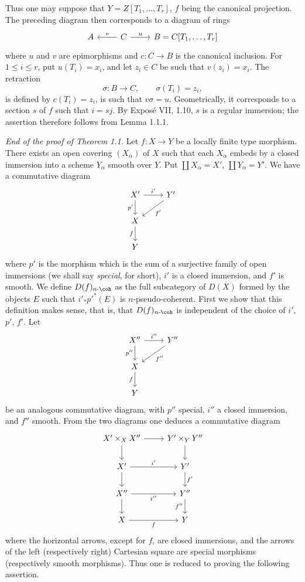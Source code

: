 \documentclass[11pt]{article}
\begin{document}
Thus one may suppose that \(Y=Z[T_1,\ldots,T_r]\), \(f\) being the canonical projection. The preceding diagram then corresponds to a diagram of rings
\[
\begin{tikzcd}
A & C \arrow[l,"v"'] \arrow[r,"u"] & B=C[T_1,\ldots,T_r]
\end{tikzcd}
\]
where \(u\) and \(v\) are epimorphisms and \(c:C\to B\) is the canonical inclusion. For \(1\leq i\leq r\), put \(u(T_i)=x_i\), and let \(z_i\in C\) be such that \(v(z_i)=x_i\). The retraction
\[
  \sigma:B\longrightarrow C,\qquad \sigma(T_i)=z_i,
\]
is defined by \(c(T_i)=z_i\), is such that \(v\sigma=u\). Geometrically, it corresponds to a section \(s\) of \(f\) such that \(i=sj\). By Exposé VII, 1.10, \(s\) is a regular immersion; the assertion therefore follows from Lemma 1.1.1.

\emph{End of the proof of Theorem 1.1.} Let \(f:X\to Y\) be a locally finite type morphism. There exists an open covering \((X_\alpha)\) of \(X\) such that each \(X_\alpha\) embeds by a closed immersion into a scheme \(Y_\alpha\) smooth over \(Y\). Put \(\coprod X_\alpha=X'\), \(\coprod Y_\alpha=Y'\). We have a commutative diagram
\[
\begin{tikzcd}
X' \arrow[r,"i'"] \arrow[d,"p'"'] & Y' \arrow[dl,"f'"]\\
X \arrow[d,"f"']\\
Y
\end{tikzcd}
\]
where \(p'\) is the morphism which is the sum of a surjective family of open immersions (we shall say \emph{special}, for short), \(i'\) is a closed immersion, and \(f'\) is smooth. We define \(D(f)_{n\text{-}\coh}\) as the full subcategory of \(D(X)\) formed by the objects \(E\) such that \(i'_*p'^*(E)\) is \(n\)-pseudo-coherent. First we show that this definition makes sense, that is, that \(D(f)_{n\text{-}\coh}\) is independent of the choice of \(i'\), \(p'\), \(f'\). Let
\[
\begin{tikzcd}
X'' \arrow[r,"i''"] \arrow[d,"p''"'] & Y'' \arrow[dl,"f''"]\\
X \arrow[d,"f"']\\
Y
\end{tikzcd}
\]
be an analogous commutative diagram, with \(p''\) special, \(i''\) a closed immersion, and \(f''\) smooth. From the two diagrams one deduces a commutative diagram
\[
\begin{tikzcd}
X'\times_X X'' \arrow[r] \arrow[d] & Y'\times_Y Y'' \arrow[d]\\
X' \arrow[r,"i'"] \arrow[d] & Y' \arrow[d,"f'"]\\
X'' \arrow[r,"i''"'] \arrow[d] & Y'' \arrow[d,"f''"']\\
X \arrow[r,"f"'] & Y
\end{tikzcd}
\]
where the horizontal arrows, except for \(f\), are closed immersions, and the arrows of the left (respectively right) Cartesian square are special morphisms (respectively smooth morphisms). Thus one is reduced to proving the following assertion.
\end{document}
